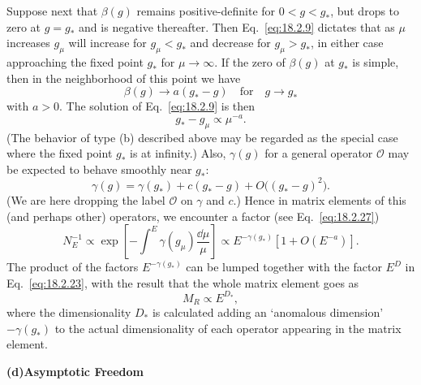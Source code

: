Suppose next that $\beta(g)$ remains positive-definite for $0<g<g_*$, but
drops to zero at $g=g_*$ and is negative thereafter. Then Eq.\ \eqref{eq:18.2.9}
dictates that as $\mu$ increases $g_\mu$ will increase for $g_\mu<g_*$ and decrease for
$g_\mu>g_*$, in either case approaching the fixed point $g_*$ for $\mu\to\infty$. If the
zero of $\beta(g)$ at $g_*$ is simple, then in the neighborhood of this point we
have
\begin{equation}
\beta(g)\to a(g_*-g)\quad\text{for}\quad g\to g_*
\label{eq:18.3.11}
\end{equation}
with $a>0$. The solution of Eq.\ \eqref{eq:18.2.9} is then
\begin{equation}
g_*-g_\mu\propto\mu^{-a}.
\label{eq:18.3.12}
\end{equation}
(The behavior of type (b) described above may be regarded as the special
case where the fixed point $g_*$ is at infinity.) Also, $\gamma(g)$ for a general
operator $\mathcal O$ may be expected to behave smoothly near $g_*$:
\begin{equation}
\gamma(g)=\gamma(g_*)+c(g_*-g)+O\bigl((g_*-g)^2\bigr).
\label{eq:18.3.13}
\end{equation}
(We are here dropping the label $\mathcal O$ on $\gamma$ and $c$.) Hence in matrix elements of
this (and perhaps other) operators, we encounter a factor (see Eq.\ \eqref{eq:18.2.27})
\begin{equation}
N_E^{-1}\propto\exp\left[-\int^E\gamma(g_\mu)\frac{\dd\mu}{\mu}\right]
\propto E^{-\gamma(g_*)}\left[1+O(E^{-a})\right].
\label{eq:18.3.14}
\end{equation}
The product of the factors $E^{-\gamma(g_*)}$ can be lumped together with the factor
$E^D$ in Eq.\ \eqref{eq:18.2.23}, with the result that the whole matrix element goes as
\begin{equation}
M_R\propto E^{D_*},
\label{eq:18.3.15}
\end{equation}
where the dimensionality $D_*$ is calculated adding an `anomalous dimension'
$-\gamma(g_*)$ to the actual dimensionality of each operator appearing in
the matrix element.

\medskip
\noindent\textbf{(d)\quad Asymptotic Freedom}

